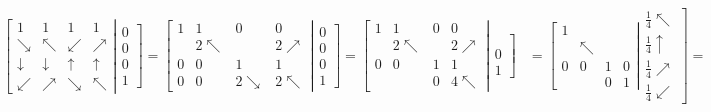 \documentclass[twoside]{amsart}
\theoremstyle{plain}
\theoremstyle{definition}
\begin{document}
\[
\begin{gathered}
 \begin{aligned} 
  \left[ \begin{matrix} 1 & 1 & 1 & 1 \\ 
      \searrow & \nwarrow & \swarrow & \nearrow \\
      \downarrow & \downarrow & \uparrow & \uparrow \\
      \swarrow & \nearrow & \searrow & \nwarrow 
\end{matrix} \right| \left. \begin{matrix} 0 \\ 0 \\ 0 \\ 1 \end{matrix} \right]  = \left[ \begin{matrix} 
       1 & 1 & 0 & 0 \\
       & 2 \nwarrow & & 2 \nearrow \\ 
       0 & 0 & 1 & 1  \\
       0 & 0 & 2 \searrow & 2 \nwarrow 
\end{matrix} \right| \left. \begin{matrix} 0 \\ 0 \\ 0 \\ 1 \end{matrix} \right] = 
  \left[ 
    \begin{matrix} 
      1 & 1 & 0 & 0 \\
      & 2 \nwarrow & & 2 \nearrow \\ 
      0 & 0 & 1 & 1 \\
      & & 0 & 4 \nwarrow \end{matrix} \right| \left. \begin{matrix} \\ \\ 0 \\ 1 \end{matrix} \right] 
  & = \left[ \begin{matrix} 1 & & & \\ & \nwarrow & &  \\ 0 & 0 & 1 & 0 \\ & & 0 & 1 \end{matrix} \right| \left. \begin{matrix} \frac{1}{4} \nwarrow \\ \frac{1}{4} \uparrow \\ \frac{1}{4} \nearrow \\ \frac{1}{4} \swarrow \end{matrix} \right] = \\

\end{aligned}
\end{gathered}\]
\end{document}
